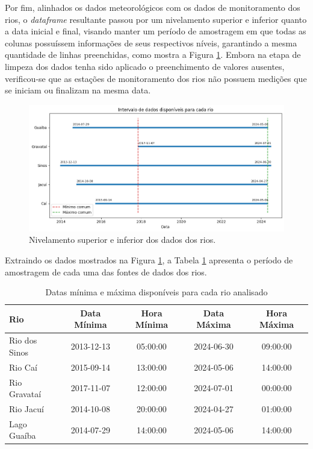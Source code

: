 Por fim, alinhados os dados meteorológicos com os dados de monitoramento dos rios, o \textit{dataframe} resultante passou por um nivelamento superior e inferior quanto a data inicial e final, visando manter um período de amostragem em que todas as colunas possuíssem informações de seus respectivos níveis, garantindo a mesma quantidade de linhas preenchidas, como mostra a Figura \ref{fig:nivelamento_superior_inferior_nivel_rios}. Embora na etapa de limpeza dos dados tenha sido aplicado o preenchimento de valores ausentes, verificou-se que as estações de monitoramento dos rios não possuem medições que se iniciam ou finalizam na mesma data.
\begin{figure}[H]
	\caption{\label{fig:nivelamento_superior_inferior_nivel_rios}Nivelamento superior e inferior dos dados dos rios.}
	\begin{center}
		\includegraphics[scale=0.55]{figuras/nivelamento_superior_inferior_dados_rios.png}
	\end{center}
\end{figure}

Extraindo os dados mostrados na Figura \ref{fig:nivelamento_superior_inferior_nivel_rios}, a Tabela \ref{tab:periodo_amostragem} apresenta o período de amostragem de cada uma das fontes de dados dos rios.
\begin{table}[H]
	\centering
	\begin{tabular}{|l|c|c|c|c|}
	\hline
	\textbf{Rio} & \textbf{Data Mínima} & \textbf{Hora Mínima} & \textbf{Data Máxima} & \textbf{Hora Máxima} \\
	\hline
	Rio dos Sinos & 2013-12-13 & 05:00:00 & 2024-06-30 & 09:00:00 \\
	Rio Caí       & 2015-09-14 & 13:00:00 & 2024-05-06 & 14:00:00 \\
	Rio Gravataí  & 2017-11-07 & 12:00:00 & 2024-07-01 & 00:00:00 \\
	Rio Jacuí     & 2014-10-08 & 20:00:00 & 2024-04-27 & 01:00:00 \\
	Lago Guaíba    & 2014-07-29 & 14:00:00 & 2024-05-06 & 14:00:00 \\
	\hline
	\end{tabular}
	\caption{Datas mínima e máxima disponíveis para cada rio analisado}
	\label{tab:periodo_amostragem}
\end{table}

